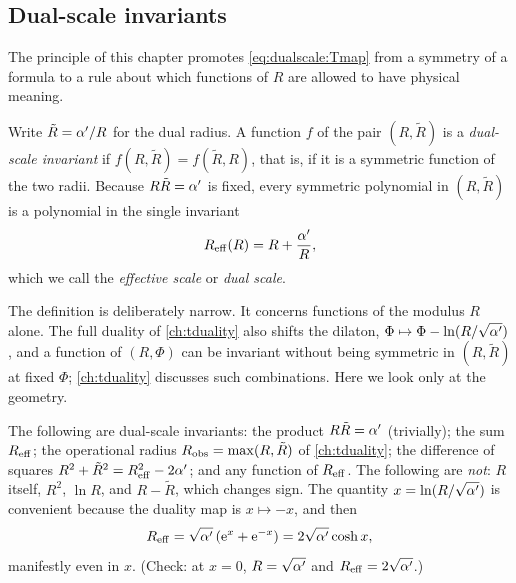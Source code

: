 \subsection{Dual-scale invariants}

The principle of this chapter promotes \eqref{eq:dualscale:Tmap} from a symmetry of a formula
to a rule about which functions of $R$ are allowed to have physical meaning.

\begin{definition}\label{def:dualscale:invariant}
Write $\tilde R=\alpha'/R$ for the dual radius. A function $f$ of the pair
$(R,\tilde R)$ is a \emph{dual-scale invariant} if $f(R,\tilde R)=f(\tilde R,R)$, that is, if
it is a symmetric function of the two radii. Because $R\tilde R=\alpha'$ is fixed, every symmetric
polynomial in $(R,\tilde R)$ is a polynomial in the single invariant
\begin{equation}\label{eq:dualscale:Reff}
 R_{\rm eff}(R)=R+\frac{\alpha'}{R},
\end{equation}
which we call the \emph{effective scale} or \emph{dual scale}.
\end{definition}

The definition is deliberately narrow. It concerns functions of the modulus $R$ alone. The
full duality of \cref{ch:tduality} also shifts the dilaton, $\Phi\mapsto\Phi-\ln(R/\sqrt{\alpha'})$
, and a function of $(R,\Phi)$ can be invariant without being
symmetric in $(R,\tilde R)$ at fixed $\Phi$; \cref{ch:tduality} discusses such combinations.
Here we look only at the geometry.

\begin{example}\label{ex:dualscale:invariants}
The following are dual-scale invariants: the product $R\tilde R=\alpha'$ (trivially); the sum
$R_{\rm eff}$; the operational radius $R_{\rm obs}=\max(R,\tilde R)$ of \cref{ch:tduality}; the
difference of squares $R^2+\tilde R^2=R_{\rm eff}^2-2\alpha'$; and any function of $R_{\rm eff}$.
The following are \emph{not}: $R$ itself, $R^2$, $\ln R$, and $R-\tilde R$, which changes sign.
The quantity $x=\ln(R/\sqrt{\alpha'})$ is convenient because the duality map is $x\mapsto-x$, and
then
\begin{equation}\label{eq:dualscale:cosh}
 R_{\rm eff}=\sqrt{\alpha'}\,(\mathrm{e}^{x}+\mathrm{e}^{-x})=2\sqrt{\alpha'}\cosh x ,
\end{equation}
manifestly even in $x$. (Check: at $x=0$, $R=\sqrt{\alpha'}$ and $R_{\rm eff}=2\sqrt{\alpha'}$.)
\end{example}

